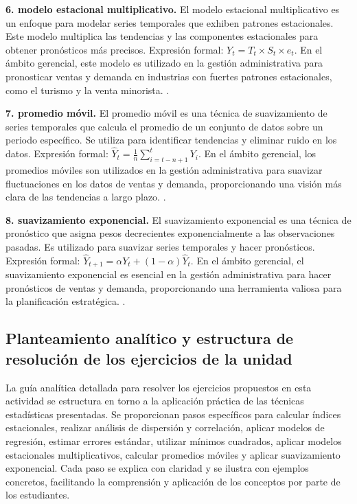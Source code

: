 {\textbf{6. modelo estacional multiplicativo.} El modelo estacional multiplicativo es un enfoque para modelar series temporales que exhiben patrones estacionales. Este modelo multiplica las tendencias y las componentes estacionales para obtener pronósticos más precisos. Expresión formal: $Y_t = T_t \times S_t \times e_t$. En el ámbito gerencial, este modelo es utilizado en la gestión administrativa para pronosticar ventas y demanda en industrias con fuertes patrones estacionales, como el turismo y la venta minorista. \citep{anderson2012,lind2012,wackerly2010}.

\textbf{7. promedio móvil.} El promedio móvil es una técnica de suavizamiento de series temporales que calcula el promedio de un conjunto de datos sobre un periodo específico. Se utiliza para identificar tendencias y eliminar ruido en los datos. Expresión formal: $\hat{Y}_t = \frac{1}{n} \sum_{i=t-n+1}^{t} Y_i$. En el ámbito gerencial, los promedios móviles son utilizados en la gestión administrativa para suavizar fluctuaciones en los datos de ventas y demanda, proporcionando una visión más clara de las tendencias a largo plazo. \citep{anderson2012,lind2012,wackerly2010}.

\textbf{8. suavizamiento exponencial.} El suavizamiento exponencial es una técnica de pronóstico que asigna pesos decrecientes exponencialmente a las observaciones pasadas. Es utilizado para suavizar series temporales y hacer pronósticos. Expresión formal: $\hat{Y}_{t+1} = \alpha Y_t + (1 - \alpha) \hat{Y}_t$. En el ámbito gerencial, el suavizamiento exponencial es esencial en la gestión administrativa para hacer pronósticos de ventas y demanda, proporcionando una herramienta valiosa para la planificación estratégica. \citep{anderson2012,lind2012,wackerly2010}.


\subsection{Planteamiento analítico y estructura de resolución de los ejercicios de la unidad}
La guía analítica detallada para resolver los ejercicios propuestos en esta actividad se estructura en torno a la aplicación práctica de las técnicas estadísticas presentadas. Se proporcionan pasos específicos para calcular índices estacionales, realizar análisis de dispersión y correlación, aplicar modelos de regresión, estimar errores estándar, utilizar mínimos cuadrados, aplicar modelos estacionales multiplicativos, calcular promedios móviles y aplicar suavizamiento exponencial. Cada paso se explica con claridad y se ilustra con ejemplos concretos, facilitando la comprensión y aplicación de los conceptos por parte de los estudiantes.

}
